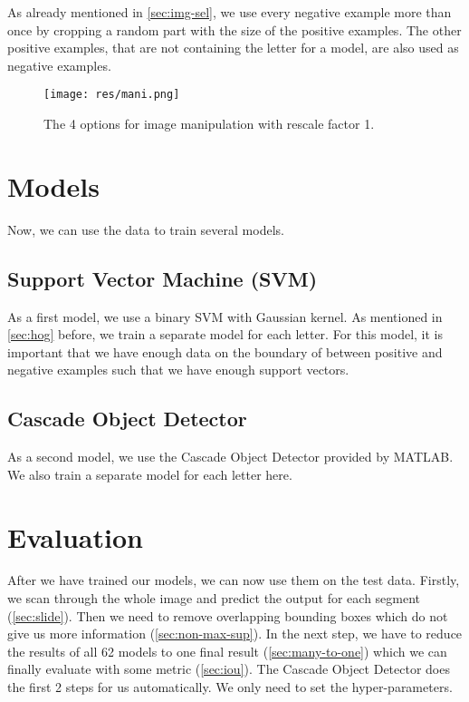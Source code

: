 \documentclass[conference]{IEEEtran}
\begin{document}
As already mentioned in \ref{sec:img-sel}, we use every negative example more than once by cropping a random part with the size of the positive examples. The other positive examples, that are not containing the letter for a model, are also used as negative examples.

\begin{figure}[htbp]
\centerline{\texttt{[image: res/mani.png]}}
\caption{The 4 options for image manipulation with rescale factor 1.}
\label{fig:mani}
\end{figure}

\section{Models}

\noindent
Now, we can use the data to train several models.

\subsection{Support Vector Machine (SVM) \cite{bib:svm}}

As a first model, we use a binary SVM with Gaussian kernel. As mentioned in \ref{sec:hog} before, we train a separate model for each letter. For this model, it is important that we have enough data on the boundary of between positive and negative examples such that we have enough support vectors.

\subsection{Cascade Object Detector \cite{bib:cod}}

As a second model, we use the Cascade Object Detector provided by MATLAB. We also train a separate model for each letter here.

\section{Evaluation}

\noindent
After we have trained our models, we can now use them on the test data. Firstly, we scan through the whole image and predict the output for each segment (\ref{sec:slide}). Then we need to remove overlapping bounding boxes which do not give us more information (\ref{sec:non-max-sup}). In the next step, we have to reduce the results of all 62 models to one final result (\ref{sec:many-to-one}) which we can finally evaluate with some metric (\ref{sec:iou}). The Cascade Object Detector does the first 2 steps for us automatically. We only need to set the hyper-parameters.
\end{document}
